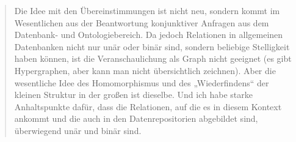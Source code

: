 



\begin{quote}
  Die Idee mit den Übereinstimmungen ist nicht neu, sondern kommt im Wesentlichen aus der Beantwortung konjunktiver Anfragen aus dem Datenbank- und Ontologie\-bereich. Da jedoch Relationen in allgemeinen Datenbanken nicht nur unär oder binär sind, sondern beliebige Stelligkeit haben können, ist die Veranschaulichung als Graph nicht geeignet (es gibt Hypergraphen, aber kann man nicht übersichtlich zeichnen). Aber die wesentliche Idee des Homomorphismus und des „Wiederfindens“ der kleinen Struktur in der großen ist dieselbe. Und ich habe starke Anhaltspunkte dafür, dass die Relationen, auf die es in diesem Kontext ankommt und die auch in den Datenrepositorien abgebildet sind, überwiegend unär und binär sind.
\end{quote}

%

